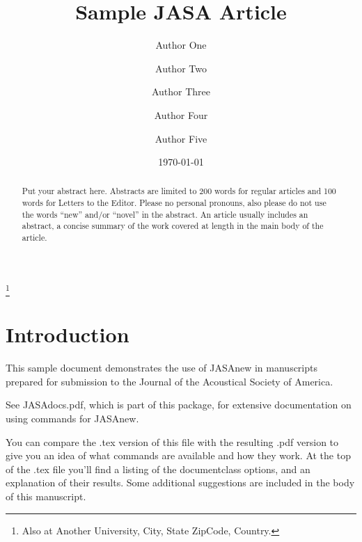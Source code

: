 \documentclass[preprint,trackchanges]{JASAnew}
\begin{document}
\title[JASA/Sample JASA Article]{Sample JASA Article}
\author{Author One}
\author{Author Two}
\author{Author Three}

\author{Author Four}
\thanks{Also at Another University, City, State ZipCode, Country.}
 
\author{Author Five}			%


\date{\today} 

\begin{abstract}
Put your abstract here. Abstracts are limited to 200 words for
regular articles and 100 words for Letters to the Editor. Please no
personal pronouns, also please do not use the words ``new'' and/or
``novel'' in the abstract. An article usually includes an abstract, a
concise summary of the work covered at length in the main body of the
article.     
\end{abstract}


\maketitle



\section{\label{sec:1} Introduction}
This sample document demonstrates the use of JASAnew in manuscripts 
prepared for submission to the Journal of the Acoustical Society of America. 

See JASAdocs.pdf, which is part of this package, for extensive
documentation on using commands for JASAnew.

You can compare the .tex version of this file with the resulting .pdf
version to give you an idea of what  commands are available and how
they work. At the top of the .tex file you'll find a listing of the
documentclass options, and an explanation of their results.
Some additional suggestions are included in the body of this
manuscript.  
\end{document}
